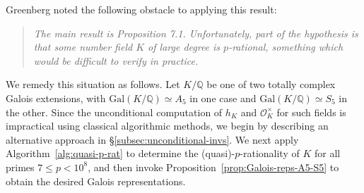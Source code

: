 \documentclass[12pt, a4paper, usenames]{amsart}
\newcommand{\Q}{\mathbb{Q}}
\theoremstyle{plain}
\theoremstyle{remark}
\theoremstyle{definition}
\newcommand{\Gal}{\mathrm{Gal}}
\begin{document}
Greenberg \cite[\S 1]{MR3512524} noted the following obstacle to applying this result:
\begin{quote}
    \textit{The main result is Proposition 7.1. 
    Unfortunately, part of the hypothesis is that some number field $K$
    of large degree is $p$-rational, 
    something which would be difficult to verify in practice.}
\end{quote}
We remedy this situation as follows.
Let $K/\Q$ be one of two totally complex Galois extensions, with
$\Gal(K/\Q) \simeq A_{5}$ in one case and $\Gal(K/\Q) \simeq S_{5}$ in the other.
Since the unconditional computation of $h_{K}$ and $\mathcal{O}_{K}^{\times}$
for such fields is impractical using classical algorithmic methods,
we begin by describing an alternative approach in \S \ref{subsec:unconditional-invs}.
We next apply Algorithm~\ref{alg:quasi-p-rat}
to determine the (quasi)-$p$-rationality of $K$
for all primes $7 \le p < 10^{8}$, and then invoke
Proposition~\ref{prop:Galois-reps-A5-S5} to obtain the desired Galois representations.
\end{document}
